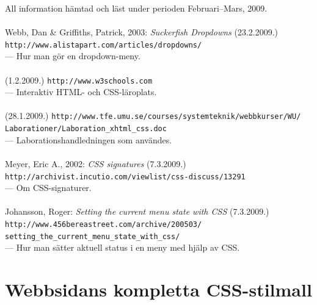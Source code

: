 \documentclass[a4paper,10pt]{article}
\begin{document}
All information hämtad och läst under perioden Februari--Mars, 2009. \\
\\
Webb, Dan \& Griffiths, Patrick, 2003: \textsl{Suckerfish Dropdowns} (23.2.2009.)\\ 
\verb+http://www.alistapart.com/articles/dropdowns/+ \\
--- Hur man gör en dropdown-meny. \\
\\
(1.2.2009.) \verb+http://www.w3schools.com+ \\
--- Interaktiv HTML- och CSS-läroplats. \\
\\
(28.1.2009.) \verb+http://www.tfe.umu.se/courses/systemteknik/webbkurser/WU/+\\\verb+Laborationer/Laboration_xhtml_css.doc+ \\
--- Laborationshandledningen som användes. \\
\\
Meyer, Eric A., 2002: \textsl{CSS signatures} (7.3.2009.) \\ 
\verb+http://archivist.incutio.com/viewlist/css-discuss/13291+ \\
--- Om CSS-signaturer. \\
\\
Johansson, Roger: \textsl{Setting the current menu state with CSS} (7.3.2009.) \\
\verb+http://www.456bereastreet.com/archive/200503/+\\
\verb+setting_the_current_menu_state_with_css/+ \\
--- Hur man sätter aktuell status i en meny med hjälp av CSS.

\appendix

\section{Webbsidans kompletta CSS-stilmall}
\end{document}
